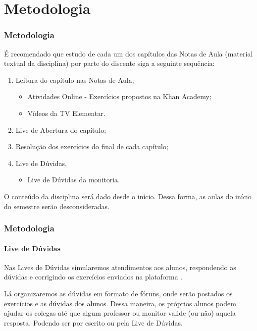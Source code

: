 \section{Metodologia}


\begin{frame}
	\frametitle{Metodologia}

	É recomendado que estudo de cada um dos capítulos das Notas de Aula (material textual da disciplina) por parte do discente siga a seguinte sequência:

	\begin{enumerate}
		\item Leitura do capítulo nas Notas de Aula;
		\begin{itemize}
			\item Atividades Online - Exercícios propostos na Khan Academy;
			\item Vídeos da TV Elementar.
		\end{itemize} \pause
		\item Live de Abertura do capítulo; \pause
		\item Resolução dos exercícios do final de cada capítulo; \pause
		\item Live de Dúvidas.
		\begin{itemize}
			\item Live de Dúvidas da monitoria.
		\end{itemize}
	\end{enumerate} \pause

	\begin{observacao}
		O conteúdo da disciplina será dado desde o início. Dessa forma, as aulas do início do semestre serão desconsideradas.
	\end{observacao}
	
\end{frame}


\begin{frame}
	\frametitle{Metodologia}
	\framesubtitle{Live de Dúvidas} 

	Nas Lives de Dúvidas simularemos atendimentos aos alunos, respondendo as dúvidas e corrigindo os exercícios enviados na plataforma .

	Lá organizaremos as dúvidas em formato de fóruns, onde serão postados os exercícios e as dúvidas dos alunos. Dessa maneira, os próprios alunos podem ajudar os colegas até que algum professor ou monitor valide (ou não) aquela resposta. Podendo ser por escrito ou pela Live de Dúvidas.
\end{frame}
